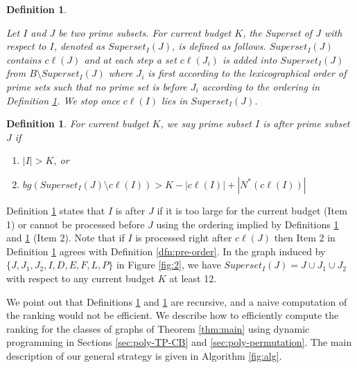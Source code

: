 \documentclass[letterpaper,11pt,abstracton]{scrartcl}
\newtheorem{dfn}[theorem]{Definition}
\begin{document}
\begin{dfn} \label{dfn:superset}


Let $I$ and $J$ be two prime subsets. For current budget $K$, the \emph{Superset of $J$ with respect to $I$, denoted as $Superset_{I}(J)$,} is defined as follows.
$Superset_{I}(J)$ contains $c\ell(J)$ and at each step a set $c\ell(J_i)$ is added into $Superset_{I}(J)$ from $B \setminus Superset_{I}(J)$ where $J_i$ is first according to the lexicographical order of prime sets such that no prime set is before  $J_i$  according to the ordering in Definition \ref{dfn:order}.
We stop once $c\ell(I)$ lies in $Superset_{I}(J)$.

\end{dfn}



\begin{dfn}\label{dfn:order}
For current budget $K$, we say prime subset $I$ is {\em after} prime subset $J$ if
\begin{enumerate}
\item $|I| > K$, or


\item  $bg( Superset_{I}(J) \setminus c\ell(I)) > K- |c\ell(I)|+|N^*(c\ell(I))|$

 \end{enumerate}
\end{dfn}

Definition \ref{dfn:order} states that $I$ is after $J$ if it is too
large for the current budget (Item 1) or cannot be processed before
$J$ using the ordering implied by Definitions \ref{dfn:superset} and
\ref{dfn:order} (Item 2).
Note that if $I$ is processed right after $c\ell(J)$ then Item 2 in Definition \ref{dfn:order} agrees with
Definition \ref{dfn:pre-order}. In the graph induced by $\{J,J_1,J_2,I,D,E,F,L,P\}$ in Figure \ref{fig:2}, we have $Superset_{I}(J)=J \cup J_1 \cup J_2$ with respect to any current budget $K$ at least 12.

We point out that Definitions \ref{dfn:superset} and \ref{dfn:order} are
recursive, and a naive computation of the ranking would not be efficient.
We describe how to efficiently compute the ranking for the classes of graphs of Theorem \ref{thm:main} using
dynamic programming in Sections \ref{sec:poly-TP-CB} and \ref{sec:poly-permutation}. The main description of our general strategy is given in Algorithm \ref{fig:alg}.
\end{document}
